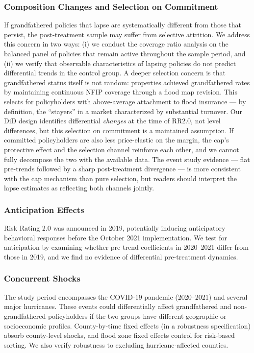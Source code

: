 \documentclass[12pt]{article}
\begin{document}
\subsubsection*{Composition Changes and Selection on Commitment} If grandfathered policies that lapse are systematically different from those that persist, the post-treatment sample may suffer from selective attrition. We address this concern in two ways: (i) we conduct the coverage ratio analysis on the balanced panel of policies that remain active throughout the sample period, and (ii) we verify that observable characteristics of lapsing policies do not predict differential trends in the control group. A deeper selection concern is that grandfathered status itself is not random: properties achieved grandfathered rates by maintaining continuous NFIP coverage through a flood map revision. This selects for policyholders with above-average attachment to flood insurance --- by definition, the ``stayers'' in a market characterized by substantial turnover. Our DiD design identifies differential \textit{changes} at the time of RR2.0, not level differences, but this selection on commitment is a maintained assumption. If committed policyholders are also less price-elastic on the margin, the cap's protective effect and the selection channel reinforce each other, and we cannot fully decompose the two with the available data. The event study evidence --- flat pre-trends followed by a sharp post-treatment divergence --- is more consistent with the cap mechanism than pure selection, but readers should interpret the lapse estimates as reflecting both channels jointly.

\subsubsection*{Anticipation Effects} Risk Rating 2.0 was announced in 2019, potentially inducing anticipatory behavioral responses before the October 2021 implementation. We test for anticipation by examining whether pre-trend coefficients in 2020--2021 differ from those in 2019, and we find no evidence of differential pre-treatment dynamics.

\subsubsection*{Concurrent Shocks} The study period encompasses the COVID-19 pandemic (2020--2021) and several major hurricanes. These events could differentially affect grandfathered and non-grandfathered policyholders if the two groups have different geographic or socioeconomic profiles. County-by-time fixed effects (in a robustness specification) absorb county-level shocks, and flood zone fixed effects control for risk-based sorting. We also verify robustness to excluding hurricane-affected counties.
\end{document}

